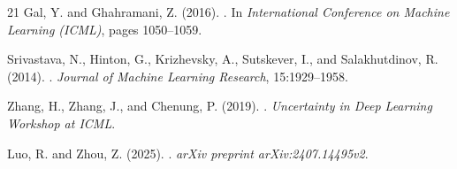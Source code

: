 \documentclass{article}
\begin{document}
\begin{thebibliography}{21}
Gal, Y. and Ghahramani, Z. (2016).
.
\newblock In \emph{International Conference on Machine Learning (ICML)}, pages 1050--1059.

Srivastava, N., Hinton, G., Krizhevsky, A., Sutskever, I., and Salakhutdinov, R. (2014).
.
\newblock \emph{Journal of Machine Learning Research}, 15:1929--1958.

Zhang, H., Zhang, J., and Chenung, P. (2019).
.
\newblock \emph{Uncertainty in Deep Learning Workshop at ICML}.

Luo, R. and Zhou, Z. (2025).
.
\newblock \emph{arXiv preprint arXiv:2407.14495v2}.

\end{thebibliography}
\end{document}
